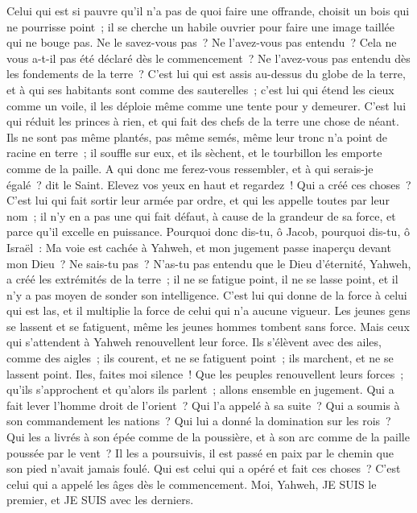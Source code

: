 \begin{multicols}{2}
Celui qui est si pauvre qu'il n'a pas de quoi faire une offrande, choisit un bois qui ne pourrisse point~; il se cherche un habile ouvrier pour faire une image taillée qui ne bouge pas.
Ne le savez-vous pas~? Ne l'avez-vous pas entendu~? Cela ne vous a-t-il pas été déclaré dès le commencement~? Ne l'avez-vous pas entendu dès les fondements de la terre~?
C'est lui qui est assis au-dessus du globe de la terre, et à qui ses habitants sont comme des sauterelles~; c'est lui qui étend les cieux comme un voile, il les déploie même comme une tente pour y demeurer.
C'est lui qui réduit les princes à rien, et qui fait des chefs de la terre une chose de néant.
Ils ne sont pas même plantés, pas même semés, même leur tronc n'a point de racine en terre~; il souffle sur eux, et ils sèchent, et le tourbillon les emporte comme de la paille.
A qui donc me ferez-vous ressembler, et à qui serais-je égalé~? dit le Saint.
Elevez vos yeux en haut et regardez~! Qui a créé ces choses~? C'est lui qui fait sortir leur armée par ordre, et qui les appelle toutes par leur nom~; il n'y en a pas une qui fait défaut, à cause de la grandeur de sa force, et parce qu'il excelle en puissance.
Pourquoi donc dis-tu, ô Jacob, pourquoi dis-tu, ô Israël~: Ma voie est cachée à Yahweh, et mon jugement passe inaperçu devant mon Dieu~?
Ne sais-tu pas~? N'as-tu pas entendu que le Dieu d'éternité, Yahweh, a créé les extrémités de la terre~; il ne se fatigue point, il ne se lasse point, et il n'y a pas moyen de sonder son intelligence.
C'est lui qui donne de la force à celui qui est las, et il multiplie la force de celui qui n'a aucune vigueur.
Les jeunes gens se lassent et se fatiguent, même les jeunes hommes tombent sans force.
Mais ceux qui s'attendent à Yahweh renouvellent leur force. Ils s'élèvent avec des ailes, comme des aigles~; ils courent, et ne se fatiguent point~; ils marchent, et ne se lassent point.
\VerseOne{}Iles, faites moi silence~! Que les peuples renouvellent leurs forces~; qu'ils s'approchent et qu'alors ils parlent~; allons ensemble en jugement.
Qui a fait lever l'homme droit de l'orient~? Qui l'a appelé à sa suite~? Qui a soumis à son commandement les nations~? Qui lui a donné la domination sur les rois~? Qui les a livrés à son épée comme de la poussière, et à son arc comme de la paille poussée par le vent~?
Il les a poursuivis, il est passé en paix par le chemin que son pied n'avait jamais foulé.
Qui est celui qui a opéré et fait ces choses~? C'est celui qui a appelé les âges dès le commencement. Moi, Yahweh, JE SUIS le premier, et JE SUIS avec les derniers.

\end{multicols}
